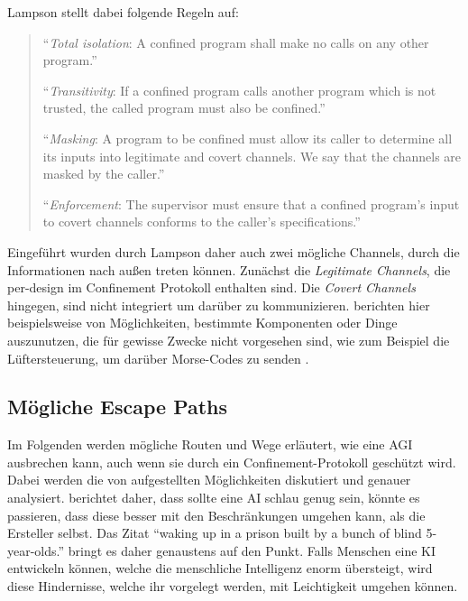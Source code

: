         Lampson stellt dabei folgende Regeln auf:
        \begin{quote}
            ``\textit{Total isolation}: A confined program shall make no calls on any other program.''

            ``\textit{Transitivity}: If a confined program calls another program which is not trusted, the
            called program must also be confined.''

            ``\textit{Masking}: A program to be confined must allow its caller to determine all its inputs into
            legitimate and covert channels. We say that the channels are masked by the caller.''

            ``\textit{Enforcement}: The supervisor must ensure that a confined program's input to covert
            channels conforms to the caller's specifications.''
        \end{quote}
        \cite{lampson1973note}
        Eingeführt wurden durch Lampson daher auch zwei mögliche Channels, durch die Informationen nach außen treten
        können.\cite{yampolskiy2012leakproofing} Zunächst die \textit{Legitimate Channels}, die per-design im Confinement
        Protokoll enthalten sind. Die \textit{Covert Channels} hingegen, sind nicht integriert um darüber zu kommunizieren.
        \citeauthor*{yampolskiy2012leakproofing} berichten hier beispielsweise von Möglichkeiten, bestimmte Komponenten oder
        Dinge auszunutzen, die für gewisse Zwecke nicht vorgesehen sind, wie zum Beispiel die Lüftersteuerung, um darüber
        Morse-Codes zu senden \cite[s. 204]{yampolskiy2012leakproofing}.

        \subsection{Mögliche Escape Paths}
        Im Folgenden werden mögliche Routen und Wege erläutert, wie eine AGI ausbrechen kann, auch wenn sie durch ein
        Confinement-Protokoll geschützt wird. Dabei werden die von \citeauthor{yampolskiy2012leakproofing} aufgestellten
        Möglichkeiten diskutiert und genauer analysiert. \citep{hvistendahl_2019} berichtet daher, dass sollte eine AI schlau genug
        sein, könnte es passieren, dass diese besser mit den Beschränkungen umgehen kann, als die Ersteller selbst.
        Das Zitat ``waking up in a prison built by a bunch of blind 5-year-olds.'' bringt es daher genaustens auf den Punkt.
        Falls Menschen eine KI entwickeln können, welche die menschliche Intelligenz enorm übersteigt, wird diese Hindernisse,
        welche ihr vorgelegt werden, mit Leichtigkeit umgehen können.

